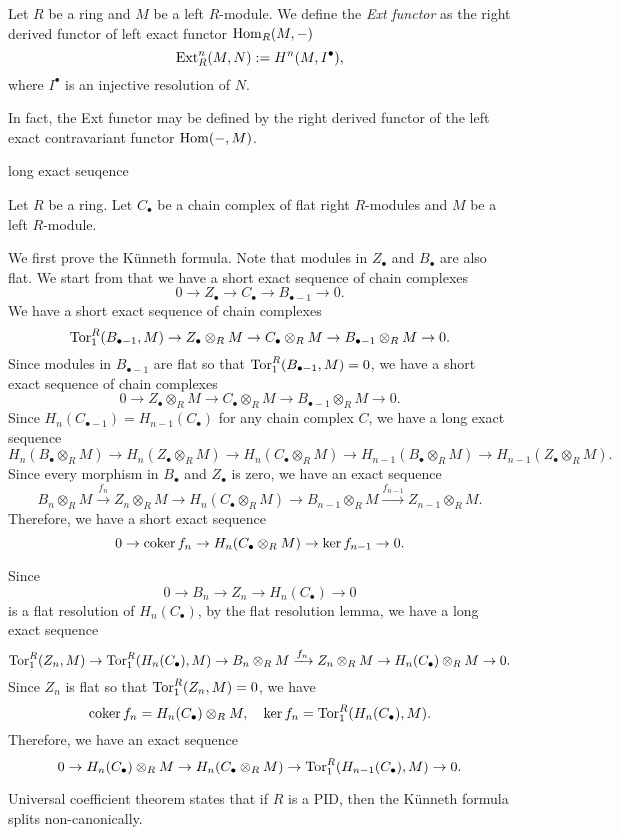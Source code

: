 \documentclass{../../large}
\begin{document}
\begin{prb}
Let $R$ be a ring and $M$ be a left $R$-module.
We define the \emph{Ext functor} as the right derived functor of left exact functor $\operatorname{Hom}_R(M,-)$
\[\operatorname{Ext}_R^n(M,N):=H^n(M,I^\bullet),\]
where $I^\bullet$ is an injective resolution of $N$.
\begin{parts}
\item In fact, the Ext functor may be defined by the right derived functor of the left exact contravariant functor $\operatorname{Hom}(-,M)$.
\end{parts}
\end{prb}

long exact seuqence


\begin{prb}
Let $R$ be a ring.
Let $C_\bullet$ be a chain complex of flat right $R$-modules and $M$ be a left $R$-module.
\end{prb}
\begin{pf}
We first prove the K\"unneth formula.
Note that modules in $Z_\bullet$ and $B_\bullet$ are also flat.
We start from that we have a short exact sequence of chain complexes
\[0\to Z_\bullet\to C_\bullet\to B_{\bullet-1}\to0.\]
We have a short exact sequence of chain complexes
\[\operatorname{Tor}_1^R(B_{\bullet-1},M)\to Z_\bullet\otimes_RM\to C_\bullet\otimes_RM\to B_{\bullet-1}\otimes_RM\to0.\]
Since modules in $B_{\bullet-1}$ are flat so that $\operatorname{Tor}_1^R(B_{\bullet-1},M)=0$, we have a short exact sequence of chain complexes
\[0\to Z_\bullet\otimes_RM\to C_\bullet\otimes_RM\to B_{\bullet-1}\otimes_RM\to0.\]
Since $H_n(C_{\bullet-1})=H_{n-1}(C_\bullet)$ for any chain complex $C$, we have a long exact sequence
\[H_n(B_\bullet\otimes_RM)\to H_n(Z_\bullet\otimes_RM)\to H_n(C_\bullet\otimes_RM)\to H_{n-1}(B_\bullet\otimes_RM)\to H_{n-1}(Z_\bullet\otimes_RM).\]
Since every morphism in $B_\bullet$ and $Z_\bullet$ is zero, we have an exact sequence
\[B_n\otimes_RM\xrightarrow{f_n}Z_n\otimes_RM\to H_n(C_\bullet\otimes_RM)\to B_{n-1}\otimes_RM\xrightarrow{f_{n-1}}Z_{n-1}\otimes_RM.\]
Therefore, we have a short exact sequence
\[0\to\operatorname{coker} f_n\to H_n(C_\bullet\otimes_RM)\to\ker f_{n-1}\to0.\]

Since
\[0\to B_n\to Z_n\to H_n(C_\bullet)\to0\]
is a flat resolution of $H_n(C_\bullet)$, by the flat resolution lemma, we have a long exact sequence
\[\operatorname{Tor}_1^R(Z_n,M)\to\operatorname{Tor}_1^R(H_n(C_\bullet),M)\to B_n\otimes_RM\xrightarrow{f_n}Z_n\otimes_RM\to H_n(C_\bullet)\otimes_RM\to0.\]
Since $Z_n$ is flat so that $\operatorname{Tor}_1^R(Z_n,M)=0$, we have
\[\operatorname{coker} f_n=H_n(C_\bullet)\otimes_RM,\quad\ker f_n=\operatorname{Tor}_1^R(H_n(C_\bullet),M).\]
Therefore, we have an exact sequence
\[0\to H_n(C_\bullet)\otimes_RM\to H_n(C_\bullet\otimes_RM)\to\operatorname{Tor}_1^R(H_{n-1}(C_\bullet),M)\to0.\]

Universal coefficient theorem states that if $R$ is a PID, then the K\"unneth formula splits non-canonically.
\end{pf}
\end{document}
